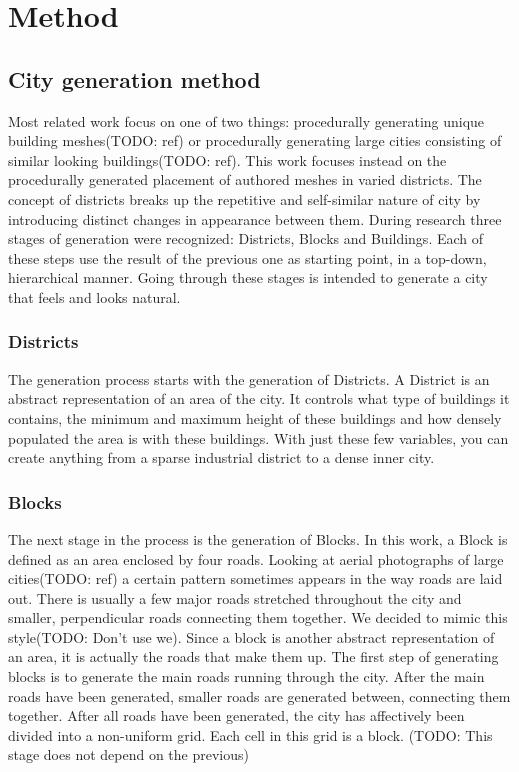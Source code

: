 \section{Method}

	\subsection{City generation method}
	Most related work focus on one of two things: procedurally generating unique building meshes(TODO: ref) or procedurally generating large cities consisting of similar looking buildings(TODO: ref). This work focuses instead on the procedurally generated placement of authored meshes in varied districts. The concept of districts breaks up the repetitive and self-similar nature of city by introducing distinct changes in appearance between them. During research three stages of generation were recognized: Districts, Blocks and Buildings. Each of these steps use the result of the previous one as starting point, in a top-down, hierarchical manner. Going through these stages is intended to generate a city that feels and looks natural.

		\subsubsection{Districts}
		The generation process starts with the generation of Districts. A District is an abstract representation of an area of the city. It controls what type of buildings it contains, the minimum and maximum height of these buildings and how densely populated the area is with these buildings. With just these few variables, you can create anything from a sparse industrial district to a dense inner city.
		
		\subsubsection{Blocks}
		The next stage in the process is the generation of Blocks. In this work, a Block is defined as an area enclosed by four roads. Looking at aerial photographs of large cities(TODO: ref) a certain pattern sometimes appears in the way roads are laid out. There is usually a few major roads stretched throughout the city and smaller, perpendicular roads connecting them together. We decided to mimic this style(TODO: Don't use we). Since a block is another abstract representation of an area, it is actually the roads that make them up. The first step of generating blocks is to generate the main roads running through the city. After the main roads have been generated, smaller roads are generated between, connecting them together. After all roads have been generated, the city has affectively been divided into a non-uniform grid. Each cell in this grid is a block. (TODO: This stage does not depend on the previous)
		
